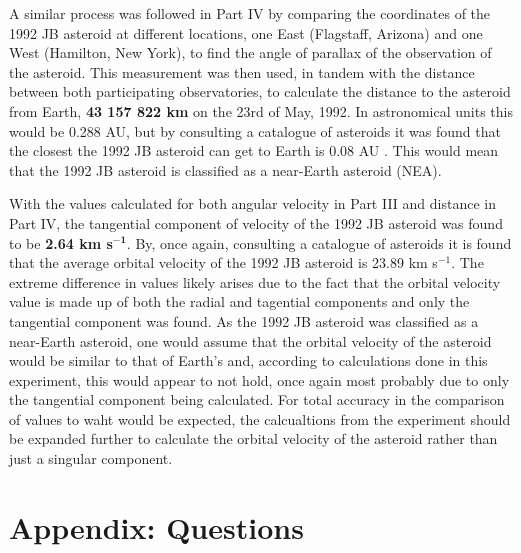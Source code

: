 \documentclass[12pt]{article}
\begin{document}
A similar process was followed in Part IV by comparing the coordinates of the 1992 JB asteroid at different locations, one East (Flagstaff, Arizona) and one West (Hamilton, New York), to find the angle of parallax of the observation of the asteroid. This measurement was then used, in tandem with the distance between
both participating observatories, to calculate the distance to the asteroid from Earth, \textbf{43 157 822 km} on the 23rd of May, 1992. In astronomical units this would be 0.288 AU, but by consulting a catalogue of asteroids it was found that the closest the 1992 JB asteroid can get to Earth is 0.08 AU \cite{1992jb}.
This would mean that the 1992 JB asteroid is classified as a near-Earth asteroid (NEA).

With the values calculated for both angular velocity in Part III and distance in Part IV, the tangential component of velocity of the 1992 JB asteroid was found to be \textbf{2.64 km s}$\mathbf{^{-1}}$. By, once again, consulting a catalogue of asteroids it is found that the average orbital velocity of the 1992 JB asteroid is 
23.89 km s$^{-1}$. The extreme difference in values likely arises due to the fact that the orbital velocity value is made up of both the radial and tagential components and only the tangential component was found. As the 1992 JB asteroid was classified as a near-Earth asteroid, one would assume that the orbital velocity of the asteroid 
would be similar to that of Earth's and, according to calculations done in this experiment, this would appear to not hold, once again most probably due to only the tangential component being calculated. For total accuracy in the comparison of values to waht would be expected, the calcualtions from the experiment should be 
expanded further to calculate the orbital velocity of the asteroid rather than just a singular component.

\newpage



 \label{sec:ref}

\vspace{1.5cm}

\listoffigures

\listoftables

\newpage

\section*{Appendix: Questions}
\end{document}
